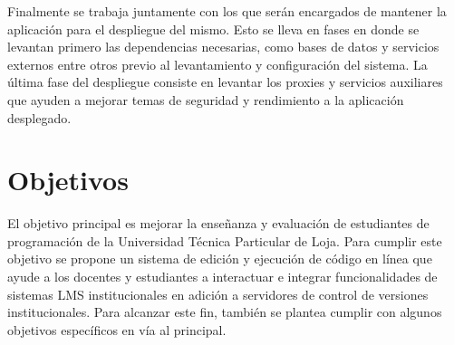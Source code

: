 Finalmente se trabaja juntamente con los que serán encargados de mantener la aplicación para el despliegue del mismo. Esto se lleva en fases en donde se levantan primero las dependencias necesarias, como bases de datos y servicios externos entre otros previo al levantamiento y configuración del sistema. La última fase del despliegue consiste en levantar los proxies y servicios auxiliares que ayuden a mejorar temas de seguridad y rendimiento a la aplicación desplegado.

\section{Objetivos}
El objetivo principal es mejorar la enseñanza y evaluación de estudiantes de programación de la Universidad Técnica Particular de Loja. Para cumplir este objetivo se propone un sistema de edición y ejecución de código en línea que ayude a los docentes y estudiantes a interactuar 
e integrar funcionalidades de sistemas LMS  institucionales en adición a servidores de control de versiones institucionales. Para alcanzar este fin, también se plantea cumplir con algunos objetivos específicos en vía al principal. 

